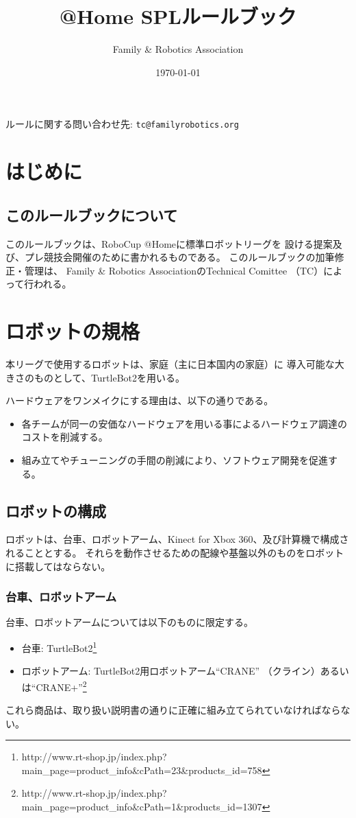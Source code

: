 \documentclass[a4j]{jarticle}
\title{@Home SPLルールブック}
\author{Family \& Robotics Association}
\date{\today}
\begin{document}
%
%
\maketitle

\begin{center}
ルールに関する問い合わせ先: {\tt tc@familyrobotics.org}
\end{center}

\newpage
%
%
\tableofcontents
\newpage

\section{はじめに}

\subsection{このルールブックについて}

このルールブックは、RoboCup @Homeに標準ロボットリーグを
設ける提案及び、プレ競技会開催のために書かれるものである。
このルールブックの加筆修正・管理は、
Family \& Robotics AssociationのTechnical Comittee
（TC）によって行われる。

\section{ロボットの規格}

本リーグで使用するロボットは、家庭（主に日本国内の家庭）に
導入可能な大きさのものとして、TurtleBot2を用いる。

ハードウェアをワンメイクにする理由は、以下の通りである。
\begin{itemize}
	\item 各チームが同一の安価なハードウェアを用いる事によるハードウェア調達のコストを削減する。
	\item 組み立てやチューニングの手間の削減により、ソフトウェア開発を促進する。
\end{itemize}

\subsection{ロボットの構成}

ロボットは、台車、ロボットアーム、Kinect for Xbox 360、及び計算機で構成されることとする。
それらを動作させるための配線や基盤以外のものをロボットに搭載してはならない。

\subsubsection{台車、ロボットアーム}
台車、ロボットアームについては以下のものに限定する。
\begin{itemize}
	\item 台車: TurtleBot2\footnote{http://www.rt-shop.jp/index.php?main\_page=product\_info\&cPath=23\&products\_id=758}
	\item ロボットアーム: TurtleBot2用ロボットアーム``CRANE'' （クライン）あるいは``CRANE+''\footnote{http://www.rt-shop.jp/index.php?main\_page=product\_info\&cPath=1\&products\_id=1307}
\end{itemize}
これら商品は、取り扱い説明書の通りに正確に組み立てられていなければならない。
\end{document}
